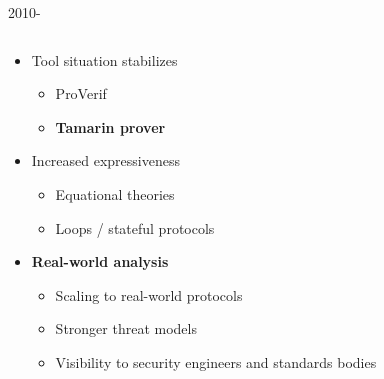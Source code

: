 \documentclass[11pt,aspectratio=169]{beamer}
\begin{document}
\begin{frame}[fragile]{2010-}
    \begin{columns}
        \begin{column}{0.7\textwidth}
            \begin{itemize}
                \item Tool situation stabilizes
                \begin{itemize}
                    \item ProVerif
                    \item \textbf{Tamarin prover}
                \end{itemize}
                \item Increased expressiveness
                \begin{itemize}
                    \item Equational theories
                    \item Loops / stateful protocols
                \end{itemize}
                \item \textbf{Real-world analysis}
                \begin{itemize}
                    \item Scaling to real-world protocols
                    \item Stronger threat models
                    \item Visibility to security engineers and standards bodies
                \end{itemize}
            \end{itemize}
        \end{column}
\end{columns}
\end{frame}
\end{document}
